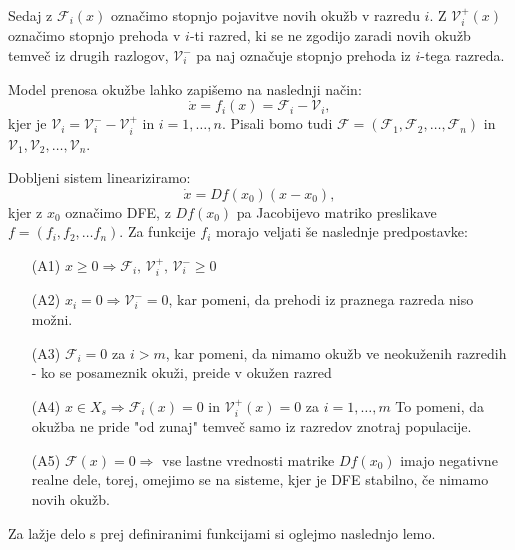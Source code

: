 \documentclass[a4paper,12pt]{article}
\newcommand{\todo}[1]{{\color{red}{#1}}}
\newcommand{\F}{\mathcal F}
\newcommand{\V}{\mathcal V}
\begin{document}
Sedaj z \(\F_i(x)\) označimo stopnjo pojavitve novih okužb v razredu \(i\). 
Z \(\V^+_i(x)\) označimo stopnjo prehoda v \(i\)-ti razred, ki se ne zgodijo zaradi 
novih okužb temveč iz drugih razlogov, \(\V^-_i\) pa naj označuje stopnjo prehoda
iz \(i\)-tega razreda. 

Model prenosa okužbe lahko zapišemo na naslednji način:
\begin{equation} \label{eq1}
\dot{x}=f_i(x)=\F_i - \V_i,
\end{equation}
kjer je \(\V_i=\V_i^- - \V_i^+\) in \(i=1,\ldots,n\). 
Pisali bomo tudi \(\F=(\F_1,\F_2,\ldots,\F_n)\) in \(\V_1,\V_2,\ldots,\V_n\).

Dobljeni sistem lineariziramo:
\begin{equation} \label{eq2}
\dot{x}=Df(x_0)(x-x_0),
\end{equation}
kjer z \(x_0\) označimo DFE, z \(Df(x_0)\) pa Jacobijevo matriko preslikave 
\(f=(f_i, f_2, \ldots f_n)\).
Za funkcije \(f_i\)
morajo veljati še naslednje predpostavke:

\begin{itemize}
    \item[(A1)] \(x\geq 0 \Rightarrow \F_i\textrm{, }\V_i^+\textrm{, }\V_i^- \geq 0\)
    \item[(A2)] \(x_i=0 \Rightarrow \V_i^- =0\), kar pomeni, da prehodi iz praznega 
    razreda niso možni. \todo{v posebnem} 
    \item[(A3)] \(\F_i=0\) za \(i>m\), kar pomeni, da nimamo okužb ve neokuženih razredih - 
    ko se posameznik okuži, preide v okužen razred 
    \item[(A4)] \(x\in X_s \Rightarrow \F_i(x)=0\) in \(\V_i^+(x)=0\) za \(i=1,\ldots,m\)
    To pomeni, da okužba ne pride "od zunaj" temveč samo iz razredov znotraj populacije. 
    \item[(A5)] \(\F(x)=0 \Rightarrow\) vse lastne vrednosti matrike \(Df(x_0)\) imajo 
    negativne realne dele, torej, omejimo se na sisteme, kjer je DFE stabilno, če nimamo novih okužb.    
\end{itemize}

Za lažje delo s prej definiranimi funkcijami si oglejmo naslednjo lemo.
\end{document}
